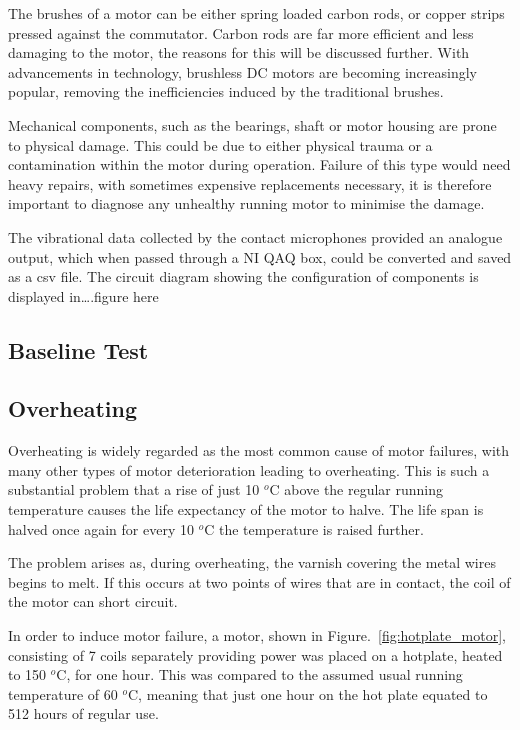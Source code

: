 The brushes of a motor can be either spring loaded carbon rods, or copper strips pressed against the commutator. Carbon rods are far more efficient and less damaging to the motor, the reasons for this will be discussed further. With advancements in technology, brushless DC motors are becoming increasingly popular, removing the inefficiencies induced by the traditional brushes. 

Mechanical components, such as the bearings, shaft or motor housing are prone to physical damage. This could be due to either physical trauma or a contamination within the motor during operation. Failure of this type would need heavy repairs, with sometimes expensive replacements necessary, it is therefore important to diagnose any unhealthy running motor to minimise the damage.

The vibrational data collected by the contact microphones provided an analogue output, which when passed through a NI QAQ box, could be converted and saved as a csv file. The circuit diagram showing the configuration of components is displayed in….figure here



\subsection{Baseline Test}

\subsection{Overheating}

Overheating is widely regarded as the most common cause of motor failures, with many other types of motor deterioration leading to overheating. This is such a substantial problem that a rise of just 10 $^o$C above the regular running temperature causes the life expectancy of the motor to halve. The life span is halved once again for every 10 $^o$C the temperature is raised further.

The problem arises as, during overheating, the varnish covering the metal wires begins to melt. If this occurs at two points of wires that are in contact, the coil of the motor can short circuit.


In order to induce motor failure, a motor, shown in Figure.~\ref{fig:hotplate_motor}, consisting of 7 coils separately providing power was placed on a hotplate, heated to 150 $^o$C, for one hour. This was compared to the assumed usual running temperature of 60 $^o$C, meaning that just one hour on the hot plate equated to 512 hours of regular use.

